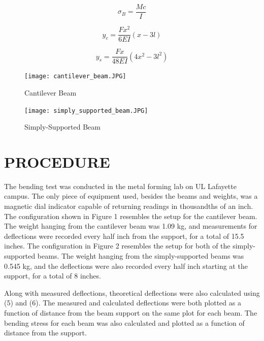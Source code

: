 \documentclass[12pt]{article}
\begin{document}
\begin{equation}
\sigma_{B} = \frac {Mc}{I}
\end{equation}

\bigskip
\begin{equation}
y_{c} = \frac{Fx^2}{6EI}(x-3l)
\end{equation}

\bigskip
\begin{equation}
y_{s} = \frac{Fx}{48EI}(4x^2-3l^2)
\end{equation}
\bigskip


\begin{figure}[h!]  
  \centering
    \texttt{[image: cantilever\_beam.JPG]}
    \caption{Cantilever Beam}
\end{figure}

\newpage

\begin{figure}[h!]  
  \centering
    \texttt{[image: simply\_supported\_beam.JPG]}
    \caption{Simply-Supported Beam}
\end{figure}

\bigskip


\section*{\fontsize{12}{12}\selectfont PROCEDURE}
The bending test was conducted in the metal forming lab on UL Lafayette campus. The only piece of equipment used, besides the beams and weights, was a magnetic dial indicator capable of returning readings in thousandths of an inch. The configuration shown in Figure 1 resembles the setup for the cantilever beam. The weight hanging from the cantilever beam was 1.09 kg, and measurements for deflections were recorded every half inch from the support, for a total of 15.5 inches. The configuration in Figure 2 resembles the setup for both of the simply-supported beams. The weight hanging from the simply-supported beams was 0.545 kg, and the deflections were also recorded every half inch starting at the support, for a total of 8 inches.
\bigskip

Along with measured deflections, theoretical deflections were also calculated using (5) and (6). The measured and calculated deflections were both plotted as a function of distance from the beam support on the same plot for each beam. The bending stress for each beam was also calculated and plotted as a function of distance from the support. 
\bigskip


\bigskip
\bigskip  
\end{document}
